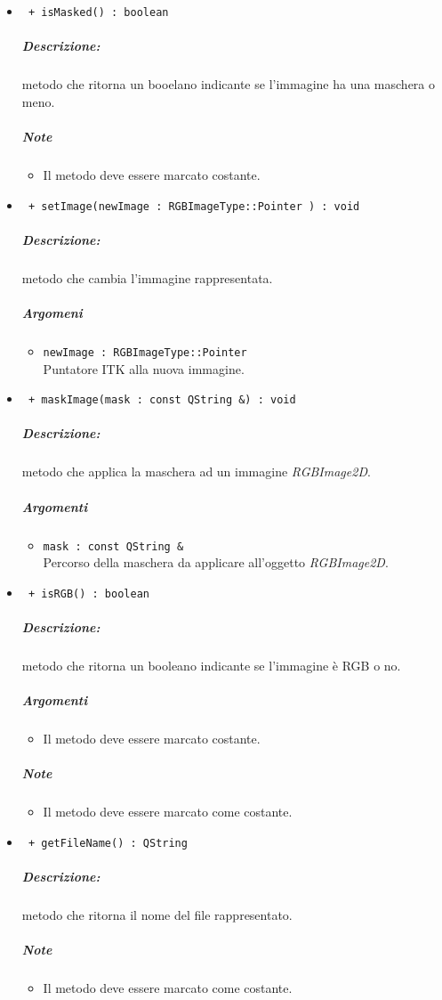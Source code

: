 \begin{itemize}
	\item \color{blue}\verb! + isMasked() : boolean!\\
	\color{black}
	\subparagraph{Descrizione:} metodo che ritorna un booelano indicante se l'immagine ha una maschera o meno.
	\subparagraph{Note}
			\begin{itemize}
				\item Il metodo deve essere marcato costante.
			\end{itemize}
	
	\item \color{blue}\verb! + setImage(newImage : RGBImageType::Pointer ) : void!\\
	\color{black}
	\subparagraph{Descrizione:} metodo che cambia l'immagine rappresentata.
	\subparagraph{Argomeni}
		\begin{itemize}
			\item \color{RoyalPurple}\verb!newImage : RGBImageType::Pointer!\\
			\color{black}Puntatore ITK\g{} alla nuova immagine.
		\end{itemize}
		
	\item \color{blue}\verb! + maskImage(mask : const QString &) : void!\\
	\color{black}
	\subparagraph{Descrizione:} metodo che applica la maschera ad un immagine \textsl{RGBImage2D}.
	\subparagraph{Argomenti}
		\begin{itemize}
			\item \color{RoyalPurple}\verb!mask : const QString &!\\
			\color{black}Percorso della maschera\g{} da applicare all'oggetto \textsl{RGBImage2D}. 
		\end{itemize}
		
	\item \color{blue}\verb! + isRGB() : boolean!\\
	\color{black}
	\subparagraph{Descrizione:} metodo che ritorna un booleano indicante se l'immagine è RGB o no.
	\subparagraph{Argomenti}
		\begin{itemize}
			\item Il metodo deve essere marcato costante.
		\end{itemize}
	\subparagraph{Note}
			\begin{itemize}
				\item Il metodo deve essere marcato come costante.
			\end{itemize}
	
	\item \color{blue}\verb! + getFileName() : QString!\\
	\color{black}
	\subparagraph{Descrizione:} metodo che ritorna il nome del file rappresentato.
	\subparagraph{Note}
		\begin{itemize}
			\item Il metodo deve essere marcato come costante.
		\end{itemize}
	

\end{itemize}
